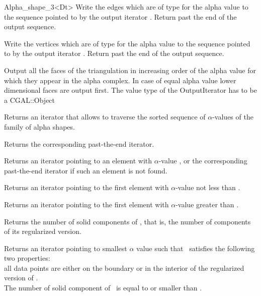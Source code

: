 \begin{ccRefClass} {Alpha_shape_3<Dt>}
{Write the edges which are of type  for 
the alpha value  to the sequence
pointed to by the output iterator . Return past the end
of the output sequence.}

{Write the vertices which are of type  for 
the alpha value  to the sequence
pointed to by the output iterator . Return past the end
of the output sequence.}

{Output all the faces  of the triangulation
in increasing order of  the alpha value for which they appear
in the alpha complex. In case of equal alpha value
lower dimensional faces are output first.
The value type of the OutputIterator has to be a  CGAL::Object}



{Returns an iterator that allows to traverse the
sorted sequence of $\alpha$-values of the family of alpha shapes.}

{Returns the corresponding past-the-end iterator.}

{Returns an iterator pointing to an element with $\alpha$-value
, or the corresponding past-the-end iterator if such 
an element is not found.}

{Returns an iterator pointing to the first element with
$\alpha$-value not less than .}

{Returns an iterator pointing to the first element with $\alpha$-value
greater than .}


{Returns the number of solid components of \ccVar, that is, the number of
components of its 
regularized version.}

{Returns an iterator pointing to smallest $\alpha$ value
such that \ccVar\ satisfies the following two properties:\\
all data points are either on the boundary or in the interior 
of the regularized version of \ccVar. \\
The number of solid component of \ccVar\  is  equal to or
smaller than .}


\end{ccRefClass}
